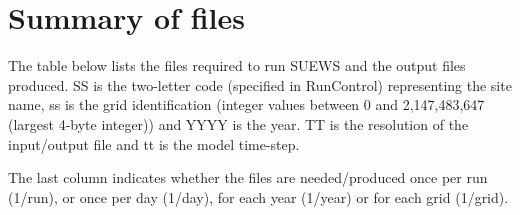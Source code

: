 \documentclass[letterpaper,10pt,english]{sphinxmanual}
\begin{document}
\section{Summary of files}
\label{\detokenize{prepare-to-run-the-model:summary-of-files}}
The table below lists the files required to run SUEWS and the output
files produced. SS is the two-letter code (specified in RunControl)
representing the site name, ss is the grid identification (integer
values between 0 and 2,147,483,647 (largest 4-byte integer)) and YYYY is
the year. TT is the resolution of the input/output file and tt is the
model time-step.

The last column indicates whether the files are needed/produced once per
run (1/run), or once per day (1/day), for each year (1/year) or for each
grid (1/grid).

\begin{DUlineblock}{0em}
\item[] 
\item[] 
\end{DUlineblock}
\end{document}
